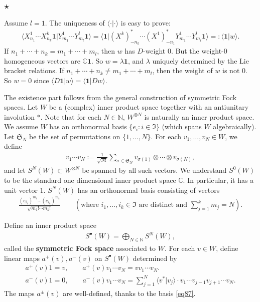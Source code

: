 \documentclass[12pt,a4paper,notitlepage]{article}
\theoremstyle{definition}
\theoremstyle{plain}
\newcommand{\fk}{\mathfrak}
\newcommand{\id}{\mathbf{1}}
\newcommand{\bk}[1]{\langle {#1}\rangle}
\newcommand{\blt}{\bullet}
\newcommand{\Cbb}{\mathbb C}
\newcommand{\Nbb}{\mathbb N}
\numberwithin{equation}{section}
\begin{document}
\subsection{$\star$}
Assume $l=1$. The uniqueness of $\bk{\cdot|\cdot}$ is easy to prove:
\begin{align*}
\bk{X^1_{n_1}\cdots X^k_{n_k}\id|Y^1_{m_1}\cdots Y^l_{m_l}\id}=	\bk{\id|(X^k)^*_{-n_k}\cdots (X^1)^*_{-n_1}Y^1_{m_1}\cdots Y^l_{m_l}\id}=:\bk{\id|w}.
\end{align*}
If $n_1+\cdots+n_k=m_1+\cdots+m_l$, then $w$ has $D$-weight $0$. But the weight-$0$ homogeneous vectors are $\Cbb\id$. So $w=\lambda\id$, and $\lambda$ uniquely determined by the Lie bracket relations. If $n_1+\cdots+n_k\neq m_1+\cdots+m_l$, then the weight of $w$ is not $0$. So $w=0$ since $\bk{D\id|w}=\bk{\id|Dw}$.

The existence part follows from the general construction of symmetric Fock spaces. Let $W$ be a (complex) inner product space together with an antiunitary involution $*$. Note that for each $N\in\Nbb$, $W^{\otimes N}$ is naturally an inner product space. We assume $W$ has an orthonormal basis $\{e_i:i\in\fk I\}$ (which spans $W$ algebraically). Let $\fk S_N$ be the set of permutations on $\{1,\dots,N\}$. For each $v_1,\dots,v_N\in W$, we define
\begin{align*}
v_1\cdots v_N:=\frac 1{\sqrt{N!}}\sum_{\sigma\in\fk S_N}v_{\sigma(1)}\otimes\cdots \otimes v_{\sigma(N)},
\end{align*}
and let $S^N(W)\subset W^{\otimes N}$ be spanned by all such vectors. We understand $S^0(W)$ to be the standard one dimensional inner product space $\Cbb$. In particular, it has a unit vector $1$. $S^N(W)$ has an orthonormal basis consisting of vectors
\begin{align}
\frac {(e_{i_1})^{m_1}\cdots (e_{i_k})^{m_k}}{\sqrt{m_1!\cdots m_k!}}\qquad(\text{where }i_1,\dots,i_k\in\fk I\text{ are distinct and }\sum_{j=1}^k m_j=N).	\label{eq87}
\end{align}



Define an inner product space
\begin{align}
S^\blt(W)=\bigoplus_{N\in\Nbb} S^N(W),	
\end{align}
called the \textbf{symmetric Fock space} associated to $W$. For each $v\in W$, define linear maps $a^+(v),a^-(v)$ on $S^\blt(W)$ determined by
\begin{subequations}
\begin{gather}
a^+(v)1=v,\qquad a^+(v)v_1\cdots v_N=vv_1\cdots v_N.\\
a^-(v)1=0,\qquad a^-(v)v_1\cdots v_N=\sum_{j=1}^N \bk{v^*|v_j}\cdot v_1\cdots v_{j-1}v_{j+1}\cdots v_N.
\end{gather}
\end{subequations}
The maps $a^\pm(v)$ are well-defined, thanks to the basis \eqref{eq87}.
\end{document}
